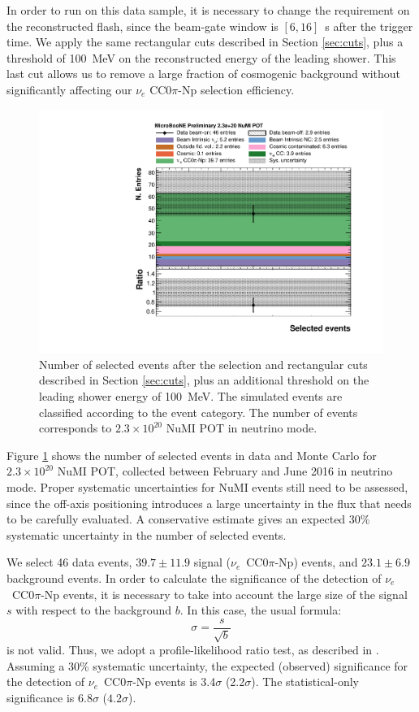 In order to run on this data sample, it is necessary to change the requirement on the reconstructed flash, since the beam-gate window is $[6,16]$~\si{\micro}s after the trigger time.
We apply the same rectangular cuts described in Section \ref{sec:cuts}, plus a threshold of 100~MeV on the reconstructed energy of the leading shower. This last cut allows us to remove a large fraction of cosmogenic background without significantly affecting our $\nu_e$ CC0$\pi$-Np selection efficiency.

\begin{figure}[htbp]
\centering
  \includegraphics[width=0.75\linewidth]{figures/numi_events.pdf}
  \caption{Number of selected events after the selection and rectangular cuts described in Section \ref{sec:cuts}, plus an additional threshold on the leading shower energy of 100~MeV. The simulated events are classified according to the event category. The number of events corresponds to $2.3\times10^{20}$ NuMI POT in neutrino mode.}\label{fig:numi_nue}
\end{figure}

Figure \ref{fig:numi_nue} shows the number of selected events in data and Monte Carlo for $2.3\times10^{20}$ NuMI POT, collected between February and June 2016 in neutrino mode. Proper systematic uncertainties for NuMI events still need to be assessed, since the off-axis positioning introduces a large uncertainty in the flux that needs to be carefully evaluated. A conservative estimate gives an expected 30\% systematic uncertainty in the number of selected events.

We select 46 data events, $39.7\pm11.9$ signal ($\nu_e$~CC0$\pi$-Np) events, and $23.1\pm6.9$ background events. In order to calculate the significance of the detection of $\nu_e$~CC0$\pi$-Np events, it is necessary to take into account the large size of the signal $s$ with respect to the background $b$. In this case, the usual formula:
\begin{equation}
    \sigma = \frac{s}{\sqrt{b}}
\end{equation}
is not valid. Thus, we adopt a profile-likelihood ratio test, as described in \cite{Cowan:2010js}.
Assuming a 30\% systematic uncertainty, the expected (observed) significance for the detection of $\nu_e$~CC0$\pi$-Np events is 3.4$\sigma$ (2.2$\sigma$). The statistical-only significance is $6.8\sigma$ ($4.2\sigma$).

